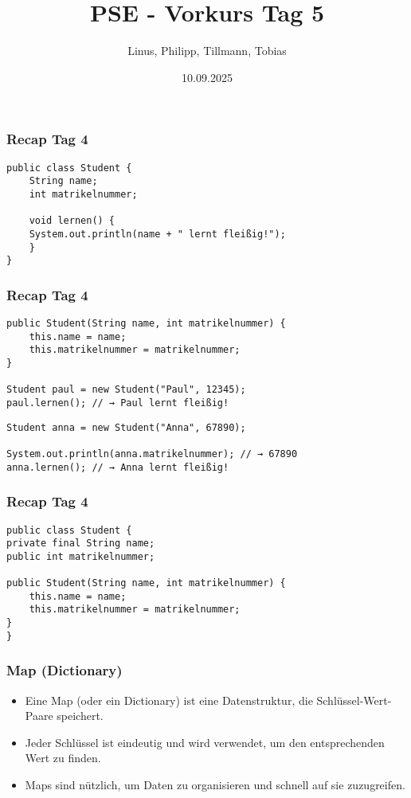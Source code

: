 \documentclass{../../presentation}
\title{PSE - Vorkurs Tag 5}
\author{Linus, Philipp, Tillmann, Tobias}
\institute{FIUS - Fachgruppe Informatik Universität Stuttgart}
\date{10.09.2025}
\begin{document}
\begin{frame}
	\titlepage
\end{frame}

\begin{frame}[fragile]
	\frametitle{Recap Tag 4}
	\pause
	\begin{verbatim}
public class Student {
    String name;
    int matrikelnummer;

    void lernen() {
	System.out.println(name + " lernt fleißig!");
    }
}
	\end{verbatim}
\end{frame}

\begin{frame}[fragile]
	\frametitle{Recap Tag 4}
	\pause
	\begin{verbatim}
public Student(String name, int matrikelnummer) {
	this.name = name;
	this.matrikelnummer = matrikelnummer;
}

Student paul = new Student("Paul", 12345);
paul.lernen(); // → Paul lernt fleißig!
	\end{verbatim}
	\pause
	\begin{verbatim}
Student anna = new Student("Anna", 67890);

System.out.println(anna.matrikelnummer); // → 67890
anna.lernen(); // → Anna lernt fleißig!
	\end{verbatim}
\end{frame}

\begin{frame}[fragile]
	\frametitle{Recap Tag 4}
	\pause
	\begin{verbatim}
public class Student {
private final String name;
public int matrikelnummer;

public Student(String name, int matrikelnummer) {
	this.name = name;
	this.matrikelnummer = matrikelnummer;
}
}
	\end{verbatim}
\end{frame}

\begin{frame}[fragile]
	\frametitle{Map (Dictionary)}
	\begin{itemize}
		\item Eine Map (oder ein Dictionary) ist eine Datenstruktur, die Schlüssel-Wert-Paare speichert.
		\item Jeder Schlüssel ist eindeutig und wird verwendet, um den entsprechenden Wert zu finden.
		\item Maps sind nützlich, um Daten zu organisieren und schnell auf sie zuzugreifen.
	\end{itemize}
\end{frame}
\end{document}
